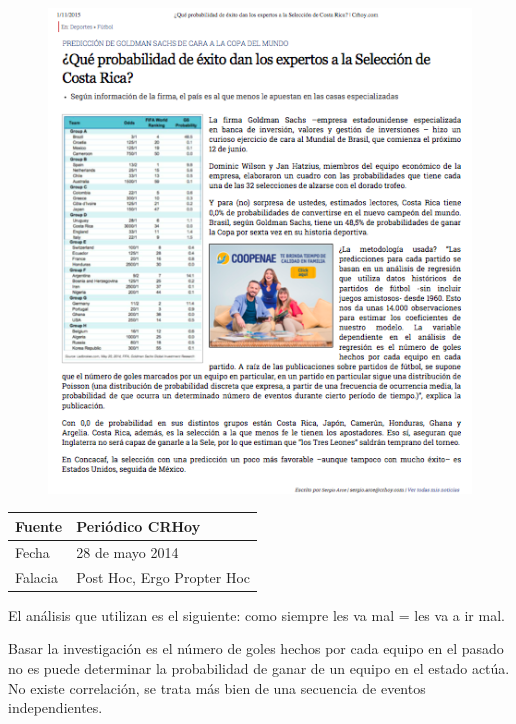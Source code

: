 \documentclass[times]{simauth}
\begin{document}
\begin{figure}[h!]
    \centering
    \includegraphics[width=15cm]{exitoSeleccion}
    \label{fig:falacia4}
\end{figure}



\newpage
\begin{table}[h!]
    \begin{tabular}{ll} 
        \toprule[1.5pt]
        Fuente & Periódico CRHoy\\
        \midrule[0.5pt]
        Fecha  & 28 de mayo 2014\\
        \midrule[0.5pt]
        Falacia & Post Hoc, Ergo Propter Hoc \\
        \bottomrule[1.5pt]
    \end{tabular} 
\end{table}

El análisis que utilizan es el siguiente: como siempre les va mal = les va a ir mal.

Basar la investigación es el número de goles hechos por cada equipo en el pasado no es puede determinar la probabilidad de ganar de un equipo en el estado actúa. No existe correlación, se trata más bien de una secuencia de eventos independientes.
\end{document}
